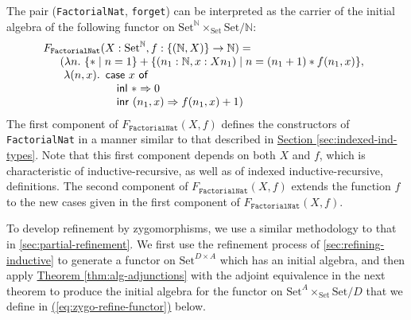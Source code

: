 \documentclass{LMCS}
\newcommand{\tyname}[1]{\texttt{#1}}
\newcommand{\sepbar}{\mathrel|}
\newcommand{\Set}{\mathrm{Set}}
\newcommand{\parenref}[1]{\hyperref[#1]{(\ref*{#1})}}
\newcommand{\thmref}[1]{\hyperref[#1]{Theorem \ref*{#1}}}
\begin{document}
The pair (\texttt{FactorialNat}, \texttt{forget}) can be interpreted
as the carrier of the initial algebra of the following functor on
$\Set^{\mathbb{N}} \times_{\Set} \Set/\mathbb{N}$:
\begin{equation}\label{eq:factorialnat}
  \begin{array}[t]{l}
      F_{\tyname{FactorialNat}}(X : \Set^{\mathbb{N}}, f : \{(\mathbb{N},X)\}
\to \mathbb{N}) = \\
      \quad
      \begin{array}{l}
        (\lambda n.\ \{* \sepbar n = 1\} + \{(n_1 : \mathbb{N}, x : Xn_1)
\sepbar n = (n_1 + 1) * f (n_1, x) \}, \\
        ~\lambda(n,x).
        \begin{array}[t]{l}
          \mathsf{case}\ x\ \mathsf{of}\\
          \quad\mathsf{inl}\ * \Rightarrow 0 \\
          \quad\mathsf{inr}\ (n_1,x) \Rightarrow f(n_1,x) + 1)
        \end{array}
      \end{array}
  \end{array}
\end{equation}
The first component of $F_{\tyname{FactorialNat}}(X,f)$ defines the
constructors of \texttt{FactorialNat} in a manner similar to that
described in \hyperref[sec:indexed-ind-types]{Section
  \ref*{sec:indexed-ind-types}}. Note that this first component
depends on both $X$ and $f$, which is characteristic of
inductive-recursive, as well as of indexed inductive-recursive,
definitions. The second component of $F_{\tyname{FactorialNat}}(X,f)$
extends the function $f$ to the new cases given in the first component
of $F_{\tyname{FactorialNat}}(X,f)$.

To develop refinement by zygomorphisms, we use a similar methodology
to that in \autoref{sec:partial-refinement}. We first use the
refinement process of \autoref{sec:refining-inductive} to generate a
functor on $\Set^{D \times A}$ which has an initial algebra, and then
apply \thmref{thm:alg-adjunctions} with the adjoint equivalence in the
next theorem to produce the initial algebra for the functor on $\Set^A
\times_\Set \Set/D$ that we define
in \parenref{eq:zygo-refine-functor} below.
\end{document}
